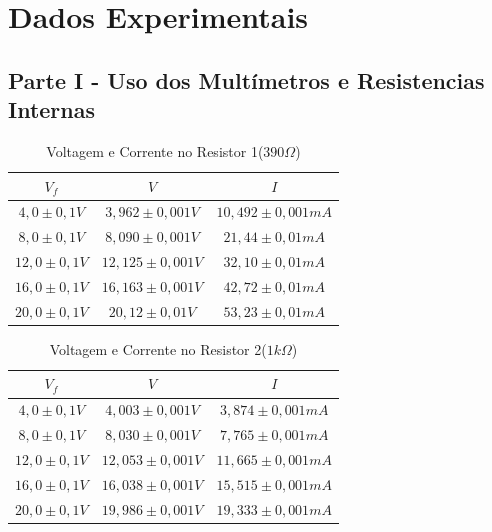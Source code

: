 \documentclass[article]{abntex2}
\begin{document}
\section{Dados Experimentais}
\subsection{Parte I - Uso dos Multímetros e Resistencias Internas}
\begin{table}[htb]
\begin{center}
\caption{Voltagem e Corrente no Resistor 1($390\Omega$)}
\begin{tabular}{ |c|c|c| }
    \hline
    $V_f$ &$V$ &$I$ \\
    \hline
    $4,0 \pm 0,1V$ &$3,962 \pm 0,001V$ &$10,492 \pm 0,001mA$ \\
    \hline
    $8,0 \pm 0,1V$ &$8,090 \pm 0,001V$ &$21,44 \pm 0,01mA$ \\
    \hline
    $12,0 \pm 0,1V$ &$12,125 \pm 0,001V$ &$32,10 \pm 0,01mA$ \\
    \hline
    $16,0 \pm 0,1V$ &$16,163 \pm 0,001V$ &$42,72 \pm 0,01mA$ \\
    \hline
    $20,0 \pm 0,1V$ &$20,12 \pm 0,01V$ &$53,23 \pm 0,01mA$ \\
    \hline
\end{tabular}
\end{center}
\end{table}
\begin{table}[htb]
\begin{center}
\caption{Voltagem e Corrente no Resistor 2($1k\Omega$)}
\begin{tabular}{ |c|c|c| }
        \hline
        $V_f$ &$V$ &$I$ \\
        \hline
        $4,0 \pm 0,1V$ &$4,003 \pm 0,001V$ &$3,874 \pm 0,001mA$ \\
        \hline
        $8,0 \pm 0,1V$ &$8,030 \pm 0,001V$ &$7,765 \pm 0,001mA$ \\
        \hline
        $12,0 \pm 0,1V$ &$12,053 \pm 0,001V$ &$11,665 \pm 0,001mA$ \\
        \hline
        $16,0 \pm 0,1V$ &$16,038 \pm 0,001V$ &$15,515\pm 0,001mA$ \\
        \hline
        $20,0 \pm 0,1V$ &$19,986 \pm 0,001V$ &$19,333 \pm 0,001mA$ \\
        \hline
\end{tabular}
\end{center}
\end{table}
\end{document}
